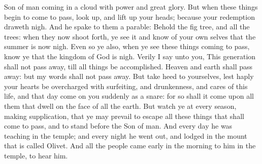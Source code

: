 Son of man coming in a cloud with power and great glory. But when these things begin to come to pass, look up, and lift up your heads; because your redemption draweth nigh.  And he spake to them a parable: Behold the fig tree, and all the trees: when they now shoot forth, ye see it and know of your own selves that the summer is now nigh. Even so ye also, when ye see these things coming to pass, know ye that the kingdom of God is nigh. Verily I say unto you, This generation shall not pass away, till all things be accomplished. Heaven and earth shall pass away: but my words shall not pass away.  But take heed to yourselves, lest haply your hearts be overcharged with surfeiting, and drunkenness, and cares of this life, and that day come on you suddenly as a snare: for so shall it come upon all them that dwell on the face of all the earth. But watch ye at every season, making supplication, that ye may prevail to escape all these things that shall come to pass, and to stand before the Son of man.  And every day he was teaching in the temple; and every night he went out, and lodged in the mount that is called Olivet. And all the people came early in the morning to him in the temple, to hear him. 

